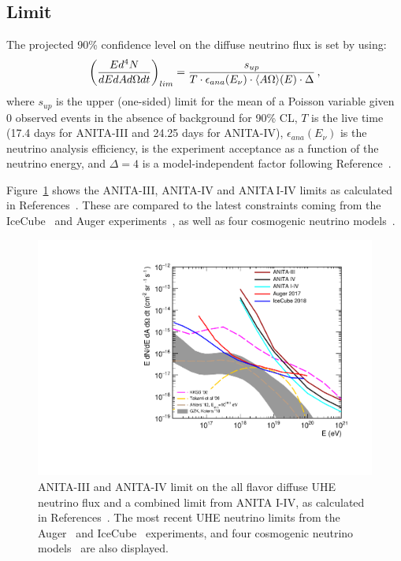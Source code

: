\subsection{Limit}
\label{subsec:limit}
The projected 90\% confidence level on the diffuse neutrino flux is set by using:
\begin{equation}
\left( \dfrac{Ed^4N}{dE dA d\Omega dt}\right)_{lim} =
\dfrac{s_{up}}{ T \cdot \epsilon_{ana} (E_\nu) \cdot \langle A\Omega\rangle(E) \cdot \Delta} \, ,
\end{equation}
\noindent
where
$s_{up}$ is the upper (one-sided) limit for the mean of a Poisson
variable given 0 observed events in the absence of background for 90\%
CL, 
$T$ is the live time 
(17.4 days for ANITA-III and 24.25 days for ANITA-IV), 
$\epsilon_{ana}(E_\nu)$ is the neutrino analysis efficiency,
\effarea is the experiment acceptance as a function of the neutrino
energy, and $\Delta=4$ is a model-independent factor following Reference~\cite{PhysRevD.73.082002}.


Figure~\ref{fig:sensitivity} shows the ANITA-III, ANITA-IV and ANITA\,I-IV limits as calculated in References~\cite{anita3cosmogenic,anita4cosmogenic}.
These are compared to the latest constraints coming from the IceCube~\cite{icecube2018} and Auger experiments~\cite{auger2017}, as well as
four cosmogenic neutrino models~\cite{kkss2002,takami2009,ahlers2012,kotera2010cosmogenic}.

\begin{figure}[!h]\centering
 \includegraphics[width=.65\linewidth]{./Figs/Limit4icemcPaper.pdf}
 \caption{
 ANITA-III and ANITA-IV limit on the all flavor diffuse UHE neutrino flux and a combined limit from ANITA I-IV, as calculated in References~\cite{anita3cosmogenic,anita4cosmogenic}.
 The most recent UHE neutrino limits
from the Auger~\cite{auger2017} and IceCube~\cite{icecube2018} experiments, and
four cosmogenic neutrino models~\cite{kkss2002,takami2009,ahlers2012,kotera2010cosmogenic} are also displayed. 
}
 \label{fig:sensitivity}
\end{figure}

